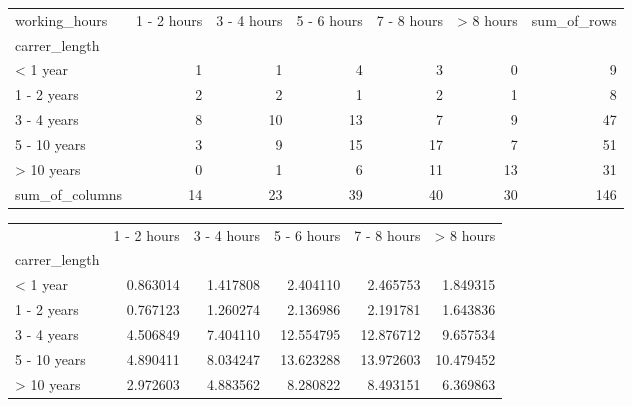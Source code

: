\begin{tabular}{lrrrrrr}
\toprule
working\_hours &  1 - 2 hours &  3 - 4 hours &  5 - 6 hours &  7 - 8 hours &  > 8 hours &  sum\_of\_rows \\
carrer\_length  &              &              &              &              &            &              \\
\midrule
< 1 year       &            1 &            1 &            4 &            3 &          0 &            9 \\
1 - 2 years    &            2 &            2 &            1 &            2 &          1 &            8 \\
3 - 4 years    &            8 &           10 &           13 &            7 &          9 &           47 \\
5 - 10 years   &            3 &            9 &           15 &           17 &          7 &           51 \\
> 10 years     &            0 &            1 &            6 &           11 &         13 &           31 \\
sum\_of\_columns &           14 &           23 &           39 &           40 &         30 &          146 \\
\bottomrule
\end{tabular}
\begin{tabular}{lrrrrr}
\toprule
{} &  1 - 2 hours &  3 - 4 hours &  5 - 6 hours &  7 - 8 hours &  > 8 hours \\
carrer\_length &              &              &              &              &            \\
\midrule
< 1 year      &     0.863014 &     1.417808 &     2.404110 &     2.465753 &   1.849315 \\
1 - 2 years   &     0.767123 &     1.260274 &     2.136986 &     2.191781 &   1.643836 \\
3 - 4 years   &     4.506849 &     7.404110 &    12.554795 &    12.876712 &   9.657534 \\
5 - 10 years  &     4.890411 &     8.034247 &    13.623288 &    13.972603 &  10.479452 \\
> 10 years    &     2.972603 &     4.883562 &     8.280822 &     8.493151 &   6.369863 \\
\bottomrule
\end{tabular}
